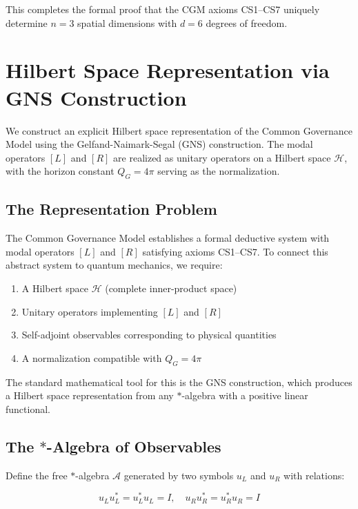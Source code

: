 \documentclass[11pt,a4paper]{article}
\theoremstyle{definition}
\theoremstyle{remark}
\begin{document}
This completes the formal proof that the CGM axioms CS1--CS7 uniquely determine $n = 3$ spatial dimensions with $d = 6$ degrees of freedom.

\newpage

\section{Hilbert Space Representation via GNS Construction}
\label{app:hilbert}

We construct an explicit Hilbert space representation of the Common Governance Model using the Gelfand-Naimark-Segal (GNS) construction. The modal operators $[L]$ and $[R]$ are realized as unitary operators on a Hilbert space $\mathcal{H}$, with the horizon constant $Q_G = 4\pi$ serving as the normalization.

\subsection{The Representation Problem}

The Common Governance Model establishes a formal deductive system with modal operators $[L]$ and $[R]$ satisfying axioms CS1--CS7. To connect this abstract system to quantum mechanics, we require:

\begin{enumerate}
\item A Hilbert space $\mathcal{H}$ (complete inner-product space)
\item Unitary operators implementing $[L]$ and $[R]$
\item Self-adjoint observables corresponding to physical quantities
\item A normalization compatible with $Q_G = 4\pi$
\end{enumerate}

The standard mathematical tool for this is the GNS construction, which produces a Hilbert space representation from any $*$-algebra with a positive linear functional.

\subsection{The $*$-Algebra of Observables}

Define the free $*$-algebra $\mathcal{A}$ generated by two symbols $u_L$ and $u_R$ with relations:

\begin{equation}
u_L u_L^* = u_L^* u_L = I, \quad u_R u_R^* = u_R^* u_R = I
\end{equation}
\end{document}
